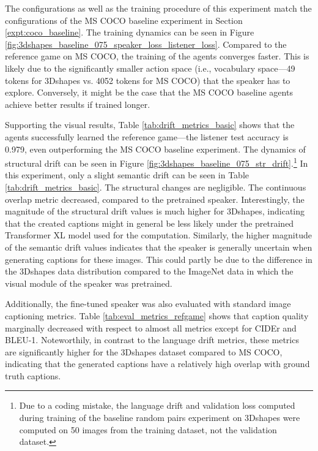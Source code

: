 The configurations as well as the training procedure of this experiment match the configurations of the MS COCO baseline experiment in Section \ref{expt:coco_baseline}. The training dynamics can be seen in Figure \ref{fig:3dshapes_baseline_075_speaker_loss_listener_loss}. Compared to the reference game on MS COCO, the training of the agents converges faster. This is likely due to the significantly smaller action space (i.e., vocabulary space---49 tokens for 3Dshapes vs. 4052 tokens for MS COCO) that the speaker has to explore. Conversely, it might be the case that the MS COCO baseline agents achieve better results if trained longer.
 
Supporting the visual results, Table \ref{tab:drift_metrics_basic} shows that the agents successfully learned the reference game---the listener test accuracy is 0.979, even outperforming the MS COCO baseline experiment.  
The dynamics of structural drift can be seen in Figure \ref{fig:3dshapes_baseline_075_str_drift}.\footnote{Due to a coding mistake, the language drift and validation loss computed during training of the baseline random pairs experiment on 3Dshapes were computed on 50 images from the training dataset, not the validation dataset.} 
In this experiment, only a slight semantic drift can be seen in Table \ref{tab:drift_metrics_basic}. The structural changes are negligible. The continuous overlap metric decreased, compared to the pretrained speaker. Interestingly, the magnitude of the structural drift values is much higher for 3Dshapes, indicating that the created captions might in general be less likely under the pretrained Transformer XL model used for the computation. Similarly, the higher magnitude of the semantic drift values indicates that the speaker is generally uncertain when generating captions for these images. This could partly be due to the difference in the 3Dshapes data distribution compared to the ImageNet data in which the visual module of the speaker was pretrained.


Additionally, the fine-tuned speaker was also evaluated with standard image captioning metrics. Table \ref{tab:eval_metrics_refgame} shows that caption quality marginally decreased with respect to almost all metrics except for CIDEr and BLEU-1. Noteworthily, in contrast to the language drift metrics, these metrics are significantly higher for the 3Dshapes dataset compared to MS COCO, indicating that the generated captions have a relatively high overlap with ground truth captions. 

